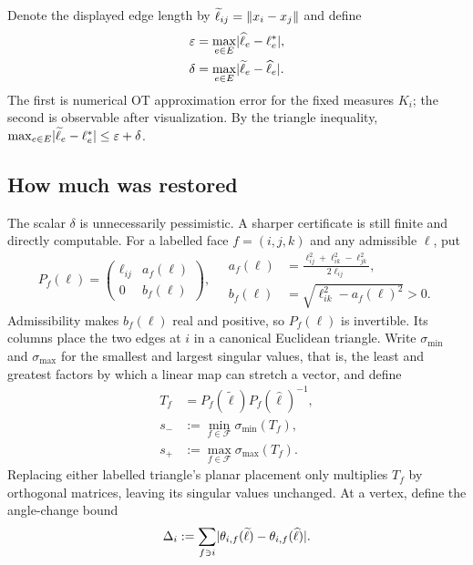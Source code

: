 Denote the displayed edge length by
$\widetilde\ell_{ij}=\lVert x_i-x_j\rVert$ and define
\begin{align}
 \varepsilon
 &=\max_{e\in E}\lvert \widehat\ell_e-\ell_e^*\rvert,
 \label{eq:ot-error}\\
 \delta
 &=\max_{e\in E}\lvert \widetilde\ell_e-\widehat\ell_e\rvert.
 \label{eq:display-error}
\end{align}
The first is numerical OT approximation error for the fixed measures $K_i$;
the second is observable after visualization.  By the triangle inequality,
$\max_{e\in E}\lvert \widetilde\ell_e-\ell_e^*\rvert\le\varepsilon+\delta$.

\subsection{How much was restored}
\label{sec:certificate}

The scalar $\delta$ is unnecessarily pessimistic.  A sharper certificate is
still finite and directly computable.  For a labelled face $f=(i,j,k)$ and any
admissible $\ell$, put
\begin{equation}
 P_f(\ell)=
 \begin{pmatrix}
  \ell_{ij} & a_f(\ell)\\
  0 & b_f(\ell)
 \end{pmatrix},
 \quad
 \begin{aligned}
 a_f(\ell)&=\frac{\ell_{ij}^2+\ell_{ik}^2-\ell_{jk}^2}
 {2\ell_{ij}},\\
 b_f(\ell)&=\sqrt{\ell_{ik}^2-a_f(\ell)^2}>0.
 \end{aligned}
 \label{eq:canonical-triangle}
\end{equation}
Admissibility makes $b_f(\ell)$ real and positive, so $P_f(\ell)$ is
invertible.  Its columns place the two edges at $i$ in a canonical Euclidean
triangle.  Write $\sigma_{\min}$ and $\sigma_{\max}$ for the smallest and
largest singular values, that is, the least and greatest factors by which a
linear map can stretch a vector, and define
\begin{equation}
 \begin{aligned}
 T_f&=P_f(\widetilde\ell)P_f(\widehat\ell)^{-1},\\
 s_-&:=\min_{f\in\mathcal F}\sigma_{\min}(T_f),\\
 s_+&:=\max_{f\in\mathcal F}\sigma_{\max}(T_f).
 \end{aligned}
 \label{eq:face-distortion}
\end{equation}
Replacing either labelled triangle's planar placement only multiplies $T_f$ by
orthogonal matrices, leaving its singular values unchanged.  At a vertex,
define the angle-change bound
\begin{equation}
 \Delta_i:=\sum_{f\ni i}
 \lvert \theta_{i,f}(\widetilde\ell)-
       \theta_{i,f}(\widehat\ell)\rvert.
 \label{eq:posterior-only-certificate}
\end{equation}

